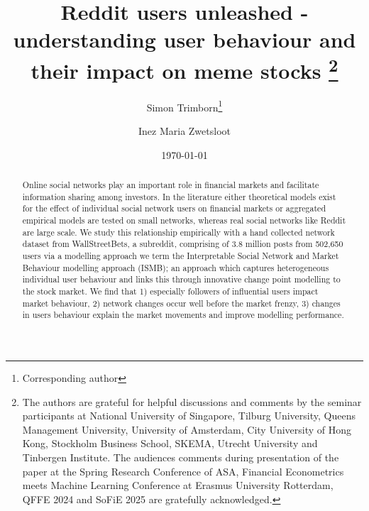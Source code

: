 \documentclass[11pt,a4paper,rorate,times]{article}
\title{	Reddit users unleashed - understanding user behaviour and their impact on meme stocks \thanks{The authors are grateful for helpful discussions and comments by the seminar participants at National University of Singapore, Tilburg University, Queens Management University, University of Amsterdam, City University of Hong Kong, Stockholm Business School, SKEMA, Utrecht University and Tinbergen Institute. The audiences comments during presentation of the paper at the Spring Research Conference of ASA, Financial Econometrics meets Machine Learning Conference at Erasmus University Rotterdam, QFFE 2024 and SoFiE 2025 are gratefully acknowledged.}
}
\author[1,2]{Simon Trimborn\thanks{Corresponding author}}
\author[3]{Inez Maria Zwetsloot}
\affil[1]{Amsterdam School of Economics, University of Amsterdam, Amsterdam}
\affil[2]{Tinbergen Institute, Amsterdam}
\affil[3]{University of Amsterdam Business School, University of Amsterdam, Amsterdam}
\date{\today}
\begin{document}
\maketitle
\vspace{-0.75cm}
\begin{abstract}

Online social networks play an important role in financial markets and facilitate information sharing among investors. In the literature either theoretical models exist for the effect of individual social network users on financial markets or aggregated empirical models are tested on small networks, whereas real social networks like Reddit are large scale. We study this relationship empirically with a hand collected network dataset from WallStreetBets, a subreddit, comprising of 3.8 million posts from 502,650 users via a modelling approach we term the Interpretable Social Network and Market Behaviour modelling approach (ISMB); an approach which captures heterogeneous individual user behaviour and links this through innovative change point modelling to the stock market. We find that 1) especially followers of influential users impact market behaviour, 2) network changes occur well before the market frenzy, 3) changes in users behaviour explain the market movements and improve modelling performance. 

	
\end{abstract}
\end{document}
